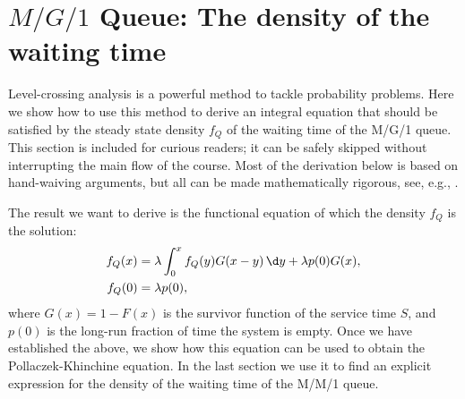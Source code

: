 \section{$M/G/1$ Queue: The density of the waiting time}

Level-crossing analysis is a powerful method to tackle probability
problems. Here we show how to use this method to derive an integral
equation that should be satisfied by the steady state density $f_Q$ of
the waiting time of the M/G/1 queue. This section is included for
curious readers; it can be safely skipped without interrupting the
main flow of the course. Most of the derivation below is based on
hand-waiving arguments, but all can be made mathematically rigorous,
see, e.g., \cite{brill08:_level_cross_method_stoch_model}.

The result we want to derive is the functional equation of which the
density $f_Q$ is the solution:
\begin{equation}\label{eq:51}
\begin{split}
   f_Q(x) &= \lambda \int_0^x f_Q(y) G(x-y) \,\d y + \lambda p(0) G(x), \\
   f_Q(0) &= \lambda p(0),
\end{split}
\end{equation}
where $G(x) = 1 - F(x)$ is the survivor function of the service time
$S$, and $p(0)$ is the long-run fraction of time the system is empty. 
Once we have established the above, we show how this equation can be
used to obtain the Pollaczek-Khinchine equation. In the last section
we use it to find an explicit expression for the density of the
waiting time of the M/M/1 queue.

